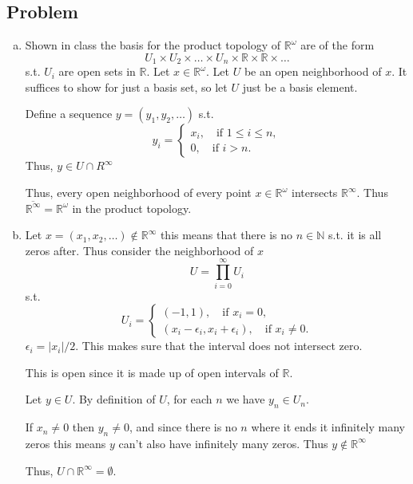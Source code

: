 \documentclass[12pt, letterpaper]{article}
\newcounter{problem}
\newcommand{\q}{
    \newpage %
    \stepcounter{problem} %
    \subsection*{Problem \arabic{problem}} %
}
\newcommand{\R}{\mathbb{R}}
\newcommand{\N}{\mathbb{N}}
\renewcommand{\t}[1]{\text{#1}}
\begin{document}
\setlength{\parindent}{0pt}
\pagestyle{fancy}
\fancyhf{}
\fancyhead[ROE]{\thepage}

\q
\begin{enumerate}[(a)]
    \item Shown in class the basis for the product topology of $\R^\omega$ are of the form 
    \[U_1 \times U_2 \times \dots \times U_n \times \R \times \R \times \dots\]
    s.t. $U_i$ are open sets in $\R$. Let $x \in \R^\omega$. Let $U$ be an open neighborhood of $x$. It suffices to show for just a basis set, so let $U$ just be a basis element.

    Define a sequence $y=(y_1,y_2,\dots)$ s.t.
    \begin{equation*}
        y_i=\begin{cases}
            x_i, \quad \t{if } 1 \leq i \leq n,\\
            0, \quad \t{if } i > n.
        \end{cases}
    \end{equation*}
    Thus, $y \in U \cap R^\infty$

    Thus, every open neighborhood of every point $x \in \R^\omega$ intersects $\R^\infty$. Thus $\overline{\R^\infty}=\R^\omega$ in the product topology.

    \item Let $x=(x_1,x_2,\dots) \notin \R^\infty$ this means that there is no $n \in \N$ s.t. it is all zeros after. Thus consider the neighborhood of $x$
    \[U=\prod_{i=0}^{\infty}U_i\]
    s.t.
    \begin{equation*}
        U_i=\begin{cases*}
            (-1,1), \quad \t{if } x_i=0,\\
            (x_i-\epsilon_i, x_i+\epsilon_i), \quad \t{if } x_i \neq 0.
        \end{cases*}
    \end{equation*}
    $\epsilon_i=|x_i|/2$. This makes sure that the interval does not intersect zero.

    This is open since it is made up of open intervals of $\R$.

    Let $y \in U$. By definition of $U$, for each $n$ we have $y_n \in U_n$.

    If $x_n \neq 0$ then $y_n \neq 0$, and since there is no $n$ where it ends it infinitely many zeros this means $y$ can't also have infinitely many zeros. Thus $y \notin \R^\infty$

    Thus, $U \cap \R^\infty=\emptyset$.


\end{enumerate}
\end{document}
